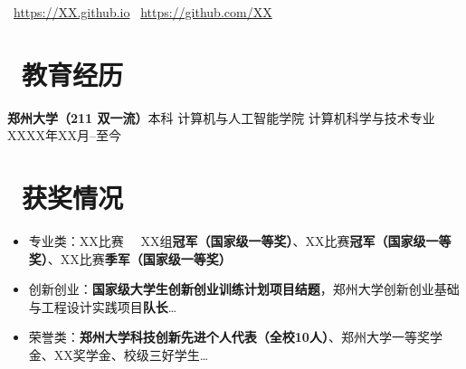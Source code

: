 \documentclass[11pt]{article}
\begin{document}
\centerline{\normalsize{
        \faExternalLink \ \href{https://XX.github.io}{https://XX.github.io} \quad
        \faGithubAlt \ \href{https://github.com/XX}{https://github.com/XX}
    }}
\vspace{1.5ex}

\section{\texorpdfstring{\makebox[\widthof{\faGraduationCap}][c]{\color{ZZU_BLUE}\faGraduationCap}\ 教育经历}{教育经历}}

{\bfseries 郑州大学（211 \textbar{} 双一流）}\enspace 本科 \enspace 计算机与人工智能学院 \enspace 计算机科学与技术专业 \hfill XXXX年XX月\hspace{0.5em}--\hspace{0.5em}至今

\section{\texorpdfstring{\makebox[\widthof{\faTrophy}][c]{\color{ZZU_BLUE}\faTrophy}\ 获奖情况}{获奖情况}}

\begin{itemize}
    \item {专业类：XX比赛 \ \textendash \ XX组{\bfseries 冠军（国家级一等奖）}、XX比赛{\bfseries 冠军（国家级一等奖）}、XX比赛{\bfseries 季军（国家级一等奖）}}
    \item {创新创业：{\bfseries 国家级大学生创新创业训练计划项目结题}，郑州大学创新创业基础与工程设计实践项目{\bfseries 队长}\ldots}
    \item {荣誉类：{\bfseries 郑州大学科技创新先进个人代表（全校10人）}、郑州大学一等奖学金、XX奖学金、校级三好学生\ldots}
\end{itemize}

\end{document}
